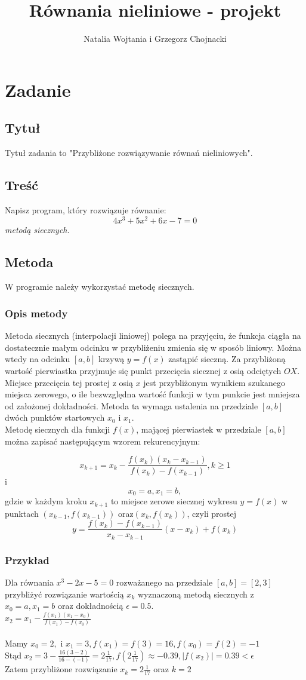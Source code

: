 \documentclass[12pt]{article}
\title{Równania nieliniowe - projekt}
\author{Natalia Wojtania i Grzegorz Chojnacki}
\begin{document}
\maketitle

\section{Zadanie}
\subsection{Tytuł}
Tytuł zadania to "Przybliżone rozwiązywanie równań nieliniowych".
\subsection{Treść}
Napisz program, który rozwiązuje równanie: $$4x^{3} + 5x^{2} + 6x - 7 = 0$$\emph{metodą siecznych.} 
\subsection{Metoda}
W programie należy wykorzystać metodę siecznych.
\subsubsection{Opis metody}
 
Metoda siecznych (interpolacji liniowej) polega na przyjęciu, że funkcja ciągła na dostatecznie małym odcinku w przybliżeniu zmienia się w sposób liniowy. Można wtedy na odcinku $[a,b]$ krzywą $y=f(x)$ zastąpić sieczną. Za przybliżoną wartość pierwiastka przyjmuje się punkt przecięcia siecznej z osią odciętych $OX$. Miejsce przecięcia tej prostej z osią $x$ jest przybliżonym wynikiem szukanego miejsca zerowego, o ile bezwzględna wartość funkcji w tym punkcie jest mniejsza od założonej dokładności.  Metoda ta wymaga ustalenia na przedziale $[a,b]$ dwóch punktów startowych $x_0$ i $x_1$.\\
Metodę siecznych dla funkcji $f(x)$, mającej pierwiastek w przedziale $[ a , b ]$ można zapisać następującym wzorem rekurencyjnym:

 $$x_{k+1}=x_k - \frac{f(x_k)(x_k-x_{k-1})}{f(x_k)-f(x_{k-1})}, k \geq 1$$ i $$x_0=a, x_1=b, $$ gdzie w każdym kroku $ x_{k+1}$ to miejsce zerowe siecznej wykresu $y=f(x)$ w punktach $(x_{k-1},f(x_{k-1}))$ oraz$ (x_{k},f(x_{k})) $, czyli prostej $$y=\frac{f(x_k)-f(x_{k-1})}{x_k-x_{k-1}}(x-x_k)+f(x_k)$$
\subsubsection{Przykład}
Dla równania $x^3-2x-5=0$ rozważanego na przedziale $[a,b]=[2,3]$ przybliżyć rozwiązanie wartością $x_k$ wyznaczoną metodą siecznych z\\
$x_0=a, x_1=b$ oraz dokładnością $\epsilon = 0.5.$
\\
$ x_2=x_1 - \frac{f(x_1)(x_1-x_{0})}{f(x_1)-f(x_{0})}$
\\ \\
 Mamy $ x_{0}=2,$ i $x_{1}=3, f(x_1)=f(3)=16, f(x_0)=f(2)=-1$ 
\\Stąd $x_2=3-\frac{16(3-2)}{16-(-1)}=2 \frac{1}{17},f(2 \frac{1}{17})\approx-0.39, |f(x_2)|=0.39 < \epsilon$
\\Zatem przybliżone rozwiązanie $x_k=2 \frac{1}{17}$ oraz $k=2$
\end{document}
